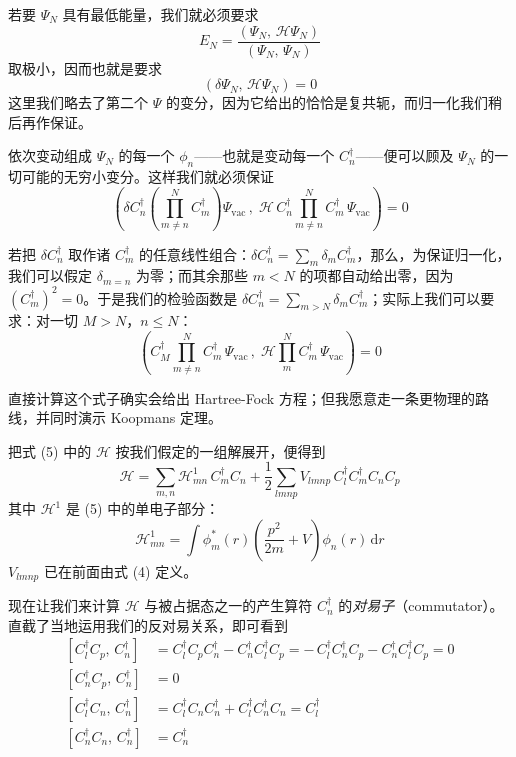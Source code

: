 若要 $\Psi_N$ 具有最低能量，我们就必须要求
\begin{equation*}
E_N = \frac{\left(\Psi_N,\, \mathcal{H}\Psi_N\right)}{\left(\Psi_N,\, \Psi_N\right)}
\end{equation*}
取极小，因而也就是要求
\begin{equation*}
\left(\delta\Psi_N,\, \mathcal{H}\Psi_N\right) = 0
\end{equation*}
这里我们略去了第二个 $\Psi$ 的变分，因为它给出的恰恰是复共轭，而归一化我们稍后再作保证。

依次变动组成 $\Psi_N$ 的每一个 $\phi_n$——也就是变动每一个 $C_n^{\dagger}$——便可以顾及 $\Psi_N$ 的一切可能的无穷小变分。这样我们就必须保证
\begin{equation*}
\left(\delta C_n^{\dagger}\left(\prod_{m\neq n}^{N} C_m^{\dagger}\right)\Psi_{\mathrm{vac}}\,,\; \mathcal{H}\, C_n^{\dagger} \prod_{m\neq n}^{N} C_m^{\dagger}\,\Psi_{\mathrm{vac}}\right) = 0
\end{equation*}

若把 $\delta C_n^{\dagger}$ 取作诸 $C_m^{\dagger}$ 的任意线性组合：$\delta C_n^{\dagger} = \sum_m \delta_m C_m^{\dagger}$，那么，为保证归一化，我们可以假定 $\delta_{m=n}$ 为零；而其余那些 $m < N$ 的项都自动给出零，因为 $(C_m^{\dagger})^2 = 0$。于是我们的检验函数是 $\delta C_n^{\dagger} = \sum_{m>N} \delta_m C_m^{\dagger}$；实际上我们可以要求：对一切 $M > N$，$n \leq N$：
\begin{equation*}
\left(C_M^{\dagger} \prod_{m\neq n}^{N} C_m^{\dagger}\,\Psi_{\mathrm{vac}}\,,\; \mathcal{H} \prod_{m}^{N} C_m^{\dagger}\,\Psi_{\mathrm{vac}}\right) = 0
\tag{6}
\end{equation*}

直接计算这个式子确实会给出 Hartree-Fock 方程；但我愿意走一条更物理的路线，并同时演示 Koopmans 定理。

把式 (5) 中的 $\mathcal{H}$ 按我们假定的一组解展开，便得到
\begin{equation*}
\mathcal{H} = \sum_{m,n} \mathcal{H}^1_{mn}\, C_m^{\dagger} C_n + \frac{1}{2}\sum_{lmnp} V_{lmnp}\, C_l^{\dagger} C_m^{\dagger} C_n C_p
\end{equation*}
其中 $\mathcal{H}^1$ 是 (5) 中的单电子部分：
\begin{equation*}
\mathcal{H}^1_{mn} = \int \phi_m^{*}(r)\left(\frac{p^2}{2m} + V\right)\phi_n(r)\,\mathrm{d}r
\end{equation*}
$V_{lmnp}$ 已在前面由式 (4) 定义。

现在让我们来计算 $\mathcal{H}$ 与被占据态之一的产生算符 $C_n^{\dagger}$ 的\emph{对易子}（commutator）。直截了当地运用我们的反对易关系，即可看到
\begin{align*}
\left[C_l^{\dagger} C_p,\, C_n^{\dagger}\right] &= C_l^{\dagger} C_p C_n^{\dagger} - C_n^{\dagger} C_l^{\dagger} C_p = -\,C_l^{\dagger} C_n^{\dagger} C_p - C_n^{\dagger} C_l^{\dagger} C_p = 0\\
\left[C_n^{\dagger} C_p,\, C_n^{\dagger}\right] &= 0\\
\left[C_l^{\dagger} C_n,\, C_n^{\dagger}\right] &= C_l^{\dagger} C_n C_n^{\dagger} + C_l^{\dagger} C_n^{\dagger} C_n = C_l^{\dagger}\\
\left[C_n^{\dagger} C_n,\, C_n^{\dagger}\right] &= C_n^{\dagger}
\end{align*}

